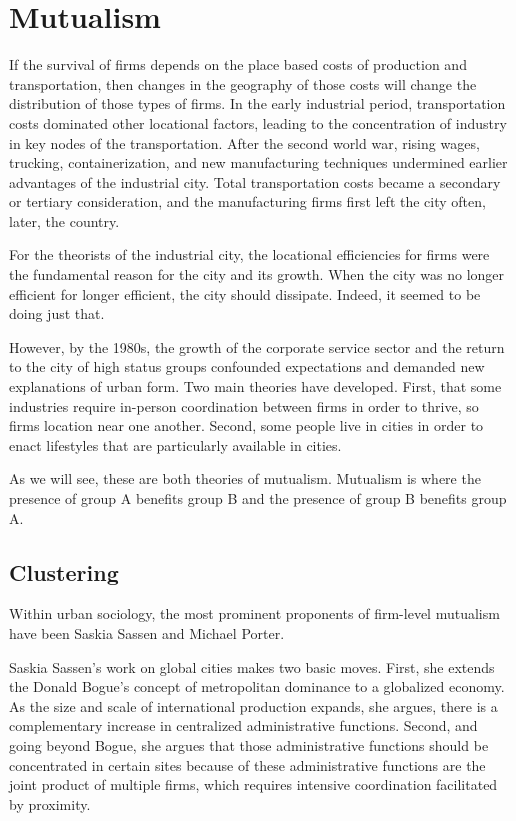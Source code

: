 \section*{Mutualism}
If the survival of firms depends on the place based costs of
production and transportation, then changes in the geography of those
costs will change the distribution of those types of firms. In the
early industrial period, transportation costs dominated other
locational factors, leading to the concentration of industry in key
nodes of the transportation. After the second world war, rising wages,
trucking, containerization, and new manufacturing techniques
undermined earlier advantages of the industrial city. Total
transportation costs became a secondary or tertiary consideration, and
the manufacturing firms first left the city often, later, the country.

For the theorists of the industrial city, the locational efficiencies
for firms were the fundamental reason for the city and its
growth. When the city was no longer efficient for longer efficient,
the city should dissipate. Indeed, it seemed to be doing just that. 

However, by the 1980s, the growth of the corporate service sector and
the return to the city of high status groups confounded expectations
and demanded new explanations of urban form. Two main theories have
developed. First, that some industries require in-person coordination
between firms in order to thrive, so firms location near one
another. Second, some people live in cities in order to enact
lifestyles that are particularly available in cities. 

As we will see, these are both theories of mutualism. Mutualism is
where the presence of group A benefits group B and the presence of
group B benefits group A. 

\subsection*{Clustering}
Within urban sociology, the most prominent proponents of firm-level
mutualism have been Saskia Sassen and Michael Porter.

Saskia Sassen's work on global cities makes two basic moves. First,
she extends the Donald Bogue's concept of metropolitan dominance to a
globalized economy. As the size and scale of international production
expands, she argues, there is a complementary increase in centralized
administrative functions. Second, and going beyond Bogue, she argues
that those administrative functions should be concentrated in certain
sites because of these administrative functions are the joint product
of multiple firms, which requires intensive coordination facilitated
by proximity.

